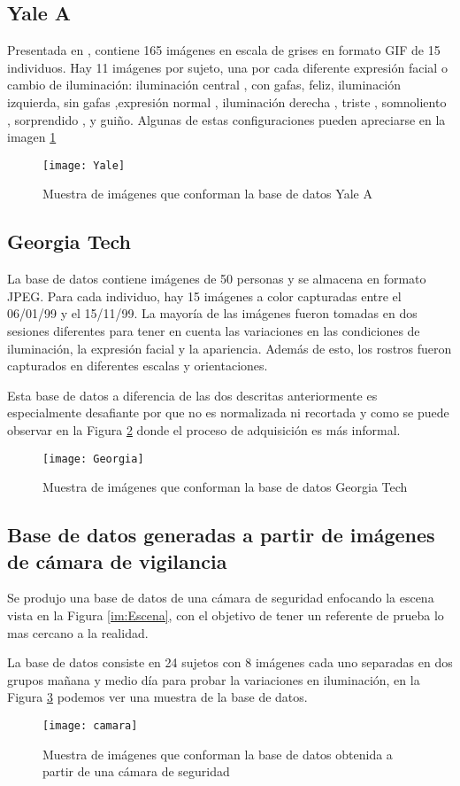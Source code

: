 \subsection{Yale A}
Presentada en \cite{georghiades1997yale}, contiene 165 imágenes en escala de grises en formato GIF de 15 individuos. Hay 11 imágenes por sujeto, una por cada diferente expresión facial o cambio de iluminación: iluminación central , con gafas, feliz, iluminación izquierda, sin gafas ,expresión normal , iluminación derecha , triste , somnoliento , sorprendido , y guiño. Algunas de estas configuraciones pueden apreciarse en la imagen \ref{Yale}
\begin{figure}[h]
	\center
	\texttt{[image: Yale]}
    \caption{Muestra de imágenes que conforman la base de datos Yale A}
    \label{Yale}
\end{figure}
\subsection{Georgia Tech}
La base de datos \cite{Georgia} contiene imágenes de 50 personas y se almacena en formato JPEG. Para cada individuo, hay 15 imágenes a color capturadas entre el 06/01/99 y el 15/11/99. La mayoría de las imágenes fueron tomadas en dos sesiones diferentes para tener en cuenta las variaciones en las condiciones de iluminación, la expresión facial y la apariencia. Además de esto, los rostros fueron capturados en diferentes escalas y orientaciones.

Esta base de datos a diferencia de las dos descritas anteriormente es especialmente desafiante por que no es normalizada ni recortada y como se puede observar en la Figura \ref{Georgia} donde el proceso de adquisición es más informal.
\begin{figure}[h]
	\centering
	\texttt{[image: Georgia]}
    \caption{Muestra de imágenes que conforman la base de datos Georgia Tech}
    \label{Georgia}
\end{figure}
\subsection{Base de datos generadas a partir de imágenes de cámara de vigilancia}
\label{scc:BDCamara}
Se produjo una base de datos de una cámara de seguridad enfocando la escena vista en la Figura \ref{im:Escena}, con el objetivo de tener un referente de prueba lo mas cercano a la realidad.

La base de datos consiste en 24 sujetos con 8 imágenes cada uno separadas en dos grupos mañana y medio día para probar la variaciones en iluminación, en la Figura \ref{camara} podemos ver una muestra de la base de datos.
\begin{figure}[h]
	\centering
	\texttt{[image: camara]}
    \caption{Muestra de imágenes que conforman la base de datos obtenida a partir de una cámara de seguridad}
    \label{camara}
\end{figure}

